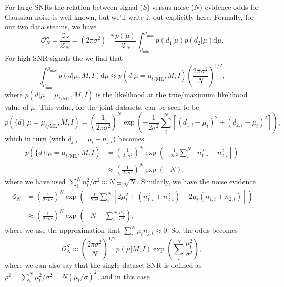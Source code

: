 For large SNRs the relation between signal ($S$) versus noise ($N$) evidence odds for Gaussian noise is well known, but we'll write it out explicitly here.
Formally, for our two data steams, we have
\begin{equation}
 \mathcal{O}^S_N = \frac{\mathcal{Z}_{S}}{\mathcal{Z}_{N}} = (2\pi\sigma^2)^{-N} \frac{p(\mu)}{\mathcal{Z}_{N}} \int_{\mu_{\text{min}}}^{\mu_{\text{max}}} p(d_1|\mu) p(d_2|\mu) {\text{d}\mu}.
\end{equation}
For high SNR signals the we find that
\begin{equation}
\int_{\mu_{\text{min}}}^{\mu_{\text{max}}} p(d|\mu,M,I) \text{d}\mu \approx p(d|\mu=\mu_{t/\text{ML}},M,I) \left(\frac{2\pi\sigma^2}{N} \right)^{1/2},
\end{equation}
where $p(d|\mu=\mu_{t/\text{ML}},M,I)$ is the likelihood at the true/maximum likelihood value of $\mu$. This value, for the joint datasets, can be seen to be
\begin{equation}
p(\{d\}|\mu=\mu_{t/\text{ML}},M,I) = \left(\frac{1}{2\pi\sigma^2}\right)^{N} \exp{\left(-\frac{1}{2\sigma^2}\sum_i^N \left[(d_{1,i} - \mu_t)^2 + (d_{2,i} - \mu_t)^2 \right]\right)},
\end{equation}
which in turn (with $d_{j,i} = \mu_t + n_{j,i}$) becomes
\begin{align}
p(\{d\}|\mu=\mu_{t/\text{ML}}, M, I) &= \left(\frac{1}{2\pi\sigma^2}\right)^{N} \exp{\left(-\frac{1}{2\sigma^2}\sum_i^N \left[ n_{1,i}^2 + n_{2,i}^2 \right]\right)} \nonumber \\
&\approx \left(\frac{1}{2\pi\sigma^2}\right)^{N} \exp{(-N)},
\end{align}
where we have used $\sum_i^N n_i^2/\sigma^2 \approx N \pm \sqrt{N}$. Similarly, we have the noise evidence
\begin{align}
\mathcal{Z}_N &= \left(\frac{1}{2\pi\sigma^2}\right)^{N} \exp{\left(-\frac{1}{2\sigma^2}\sum_i^N \left[2\mu_t^2 + (n_{1,i}^2 + n_{2,i}^2) - 2\mu_t(n_{1,i} + n_{2,i}) \right] \right)} \nonumber \\
&\approx 
\left(\frac{1}{2\pi\sigma^2}\right)^{N}\exp{\left(-N - \sum_i^N \frac{\mu_t^2}{\sigma^2} \right)},
\end{align}
where we use the approximation that $\sum_i^N \mu_t n_{j,i} \approx 0$. So, the odds becomes
\begin{equation}
\mathcal{O}_N^S \approx \left(\frac{2\pi\sigma^2}{N} \right)^{1/2}p(\mu|M,I)\exp{\left(\sum_i^N \frac{\mu_t^2}{\sigma^2}\right)},
\end{equation}
where we can also say that the single dataset SNR is defined as $\rho^2 = \sum_i^N \mu_t^2/\sigma^2 = N\left(\mu_t/\sigma\right)^2$, and in this case
